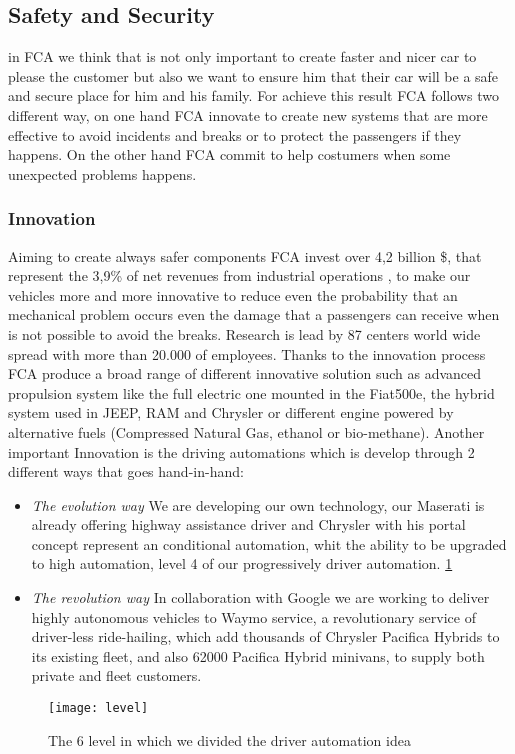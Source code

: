 \subsection{Safety and Security}
in FCA we think that is not only important to create faster and nicer car to please the customer but also we want to ensure him that their car will be a safe and secure place for him and his family. For achieve this result FCA follows two different way, on one hand FCA innovate to create new systems that are more effective to avoid incidents and breaks or to protect the passengers if they happens. On the other hand FCA commit to help costumers when some unexpected problems happens.

\subsubsection{Innovation}
Aiming to create always safer components FCA invest over 4,2 billion \$, that represent the 3,9\% of net revenues from industrial operations \cite{FCASafety}, to make our vehicles more and more innovative to reduce even the probability that an mechanical problem occurs even the damage that a passengers can receive when is not possible to avoid the breaks. Research is lead by 87 centers world wide spread with more than 20.000 of employees. Thanks to the innovation process FCA produce a broad range of different innovative solution such as advanced propulsion system like the full electric one mounted in the Fiat500e, the hybrid system used in JEEP, RAM and Chrysler or different engine powered by alternative fuels (Compressed Natural Gas, ethanol or bio-methane). Another important Innovation is the driving automations which is develop through 2 different ways\cite{FCASD} that goes hand-in-hand:
\begin{itemize}
	\item \textit{The evolution way} We are developing our own technology, our Maserati is already offering highway assistance driver and Chrysler with his portal concept represent an conditional automation, whit the ability to be upgraded to high automation, level 4 of our progressively driver automation. \ref{fig:level}
	\item \textit{The revolution way} In collaboration with Google we are working to deliver highly autonomous vehicles to Waymo service, a revolutionary service of driver-less ride-hailing, which add thousands of Chrysler Pacifica Hybrids to its existing fleet, and also 62000 Pacifica Hybrid minivans, to supply both private and fleet customers.
\end{itemize}
     \begin{figure}
     	\centering
     	\texttt{[image: level]}
     	\caption{The 6 level in which we divided the driver automation idea}
     	\label{fig:level}
     \end{figure}
     

